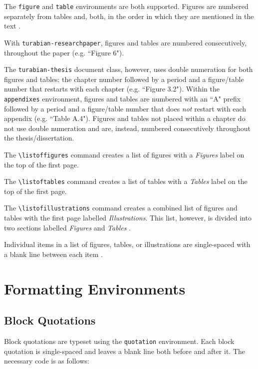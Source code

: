 \documentclass{article}
\newcommand{\textcmd}[1]{\texttt{\textbackslash #1}}
\begin{document}
The \texttt{figure} and \texttt{table} environments are both supported. Figures are numbered separately from tables and, both, in the order in which they are mentioned in the text \autocite[363, 369]{turabian_manual_2013}.

With \texttt{turabian-researchpaper}, figures and tables are numbered consecutively, throughout the paper (e.g. ``Figure 6").

The \texttt{turabian-thesis} document class, however, uses double numeration for both figures and tables: the chapter number followed by a period and a figure/table number that restarts with each chapter (e.g. ``Figure 3.2"). Within the \texttt{appendixes} environment, figures and tables are numbered with an ``A" prefix followed by a period and a figure/table number that does \emph{not} restart with each appendix (e.g. ``Table A.4"). Figures and tables not placed within a chapter do not use double numeration and are, instead, numbered consecutively throughout the thesis/dissertation.

The \textcmd{listoffigures} command creates a list of figures with a \emph{Figures} label on the top of the first page.

The \textcmd{listoftables} command creates a list of tables with a \emph{Tables} label on the top of the first page.

\marginnote{\textcmd{listofillustrations}}
The \textcmd{listofillustrations} command creates a combined list of figures and tables with the first page labelled \emph{Illustrations}. This list, however, is divided into two sections labelled \emph{Figures} and \emph{Tables} \autocite[383]{turabian_manual_2013}.

Individual items in a list of figures, tables, or illustrations are single-spaced with a blank line between each item \autocite[383]{turabian_manual_2013}.


\clearpage
\section{Formatting Environments}
\label{sec:formatting_environments}


\subsection{Block Quotations}
Block quotations are typeset using the \texttt{quotation} environment. Each block quotation is single-spaced and leaves a blank line both before and after it. The necessary code is as follows:
\end{document}
